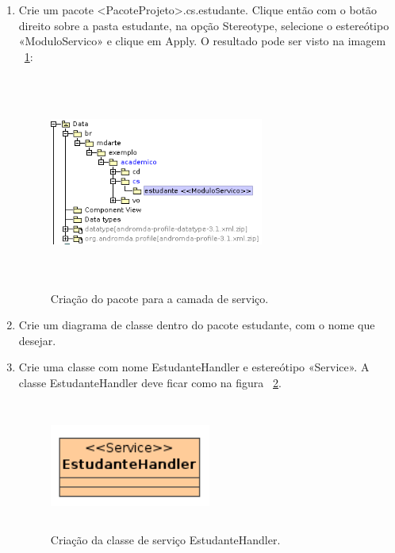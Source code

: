 \begin{enumerate}
\item Crie um pacote <PacoteProjeto>.cs.estudante. Clique então com o botão
direito sobre a pasta estudante, na opção Stereotype, selecione o estereótipo
 «ModuloServico» e clique em Apply. O resultado pode ser visto na imagem
 ~\ref{cria_pacote_servico}:
 \begin{figure}[H]
	\centering
	\includegraphics[width=200pt,height=200pt]{imgs/tutorial-mdarte-0008.png}
	\caption{Criação do pacote para a camada de serviço.}
	\label{cria_pacote_servico}
\end{figure} 
	
\item Crie um diagrama de classe dentro do pacote estudante, com o nome que desejar.
	
\item Crie uma classe com nome EstudanteHandler e estereótipo «Service». A
classe EstudanteHandler deve ficar como na figura ~\ref{cria_sevico_estudante}.
\begin{figure}[H]
	\centering
	\includegraphics[width=150pt,height=120pt]{imgs/tutorial-mdarte-0009.png}
	\caption{Criação da classe de serviço EstudanteHandler.}
	\label{cria_sevico_estudante}
\end{figure} 
	

\end{enumerate}
